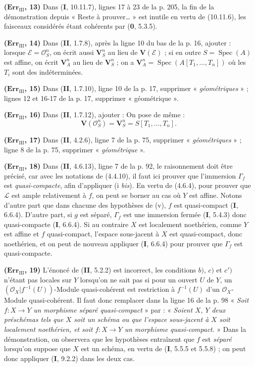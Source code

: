 \noindent\textbf{($\mathbf{Err}_{\mathrm{III}}$, 13)} Dans (\textbf{I}, 10.11.7),
lignes 17 à 23 de la p. 205, la fin de la démonstration depuis « Reste à
prouver\ldots{} » est inutile en vertu de (10.11.6), les faisceaux considérés
étant cohérents par (\textbf{0}, 5.3.5).

\noindent\textbf{($\mathbf{Err}_{\mathrm{III}}$, 14)} Dans (\textbf{II}, 1.7.8),
après la ligne 10 du bas de la p. 16, ajouter : lorsque
$\mathscr E=\mathscr O_S^n$, on écrit aussi $\mathbf V_S^n$ au lieu de
$\mathbf V(\mathscr E)$ ; si en outre $S=\operatorname{Spec}(A)$ est affine,
on écrit $\mathbf V_A^n$ au lieu de $\mathbf V_S^n$ ; on a
$\mathbf V_A^n=\operatorname{Spec}(A[T_1,\ldots,T_n])$ où les $T_i$ sont des
indéterminées.

\noindent\textbf{($\mathbf{Err}_{\mathrm{III}}$, 15)} Dans (\textbf{II}, 1.7.10),
ligne 10 de la p. 17, supprimer « \emph{géométriques} » ; lignes 12 et 16-17
de la p. 17, supprimer « géométrique ».

\noindent\textbf{($\mathbf{Err}_{\mathrm{III}}$, 16)} Dans (\textbf{II}, 1.7.12),
ajouter : On pose de même :
\[
  \mathbf V(\mathscr O_S^n)=\mathbf V_S^n=S[T_1,\ldots,T_n].
\]

\noindent\textbf{($\mathbf{Err}_{\mathrm{III}}$, 17)} Dans (\textbf{II}, 4.2.6),
ligne 7 de la p. 75, supprimer « \emph{géométriques} » ; ligne 8 de la p.
75, supprimer « \emph{géométrique} ».

\noindent\textbf{($\mathbf{Err}_{\mathrm{III}}$, 18)} Dans (\textbf{II}, 4.6.13),
ligne 7 de la p. 92, le raisonnement doit être précisé, car avec les notations
de (4.4.10), il faut ici prouver que l'immersion $\Gamma_f$ est
\emph{quasi-compacte}, afin d'appliquer (i \emph{bis}). En vertu de (4.6.4), pour
prouver que $\mathscr L$ est ample relativement à $f$, on peut se borner au
cas où $Y$ est affine. Notons d'autre part que dans chacune des hypothèses de
(v), $f$ est quasi-compact (\textbf{I}, 6.6.4). D'autre part, si $g$ est
séparé, $\Gamma_f$ est une immersion fermée (\textbf{I}, 5.4.3) donc quasi-compacte
(\textbf{I}, 6.6.4). Si au contraire $X$ est localement noethérien, comme $Y$ est affine
et $f$ quasi-compact, l'espace sous-jacent à $X$ est quasi-compact, donc
noethérien, et on peut de nouveau appliquer (\textbf{I}, 6.6.4) pour prouver que
$\Gamma_f$ est quasi-compacte.

\noindent\textbf{($\mathbf{Err}_{\mathrm{III}}$, 19)} L'énoncé de (\textbf{II},
5.2.2) est incorrect, les conditions $b)$, $c)$ et $c')$ n'étant pas locales
sur $Y$ lorsqu'on ne sait pas si pour un ouvert $U$ de $Y$, un
$(\mathscr O_X|f^{-1}(U))$-Module quasi-cohérent est restriction à $f^{-1}(U)$
d'un $\mathscr O_X$-Module quasi-cohérent. Il faut donc remplacer dans la ligne
16 de la p. 98 « \emph{Soit $f:X\to Y$ un morphisme séparé quasi-compact} »
par : « \emph{Soient $X$, $Y$ deux préschémas tels que $X$ soit un schéma ou
que l'espace sous-jacent à $X$ soit localement noethérien, et soit
$f:X\to Y$ un morphisme quasi-compact.} » Dans la démonstration, on observera
que les hypothèses entraînent que $f$ est \emph{séparé} lorsqu'on suppose que
$X$ est un schéma, en vertu de (\textbf{I}, 5.5.5 et 5.5.8) ; on peut donc appliquer
(\textbf{I}, 9.2.2) dans les deux cas.

